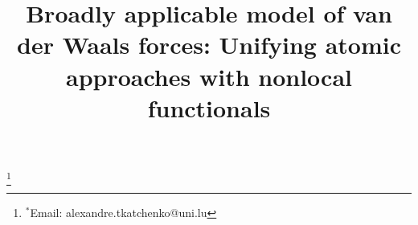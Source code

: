 

\title{Broadly applicable model of van der Waals forces: Unifying atomic approaches with nonlocal functionals}




\begingroup
\renewcommand\thefootnote{}\footnote{$^*$Email: alexandre.tkatchenko@uni.lu}%
\addtocounter{footnote}{-1}%
\endgroup



\begingroup
\setlength\bibsep{0pt}
\renewcommand{\section}[2]{}
\footnotesize

\endgroup

